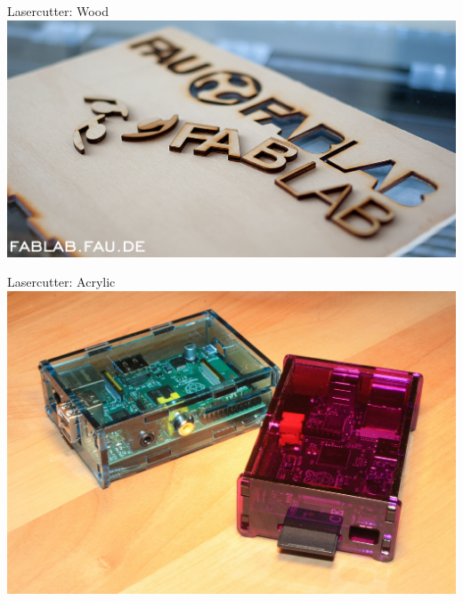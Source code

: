 \documentclass[t]{beamer}
\begin{document}
\begin{frame}{Lasercutter: Wood}
    \includegraphics[width=\textwidth]{../img/lasercut-holz.jpg}
\end{frame}
\begin{frame}{Lasercutter: Acrylic}
    \includegraphics[width=\textwidth,clip,trim=0 5cm 0 2cm]{../img/lasercut-kunststoff.jpg}
\end{frame}
\end{document}
